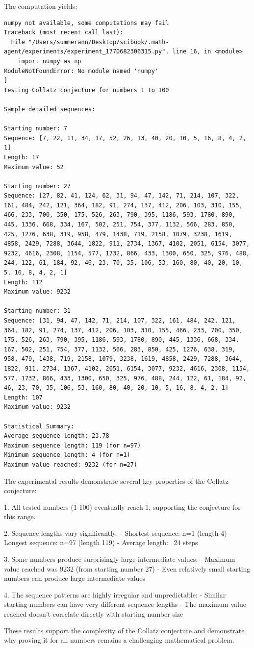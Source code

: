 The computation yields:
\begin{verbatim}
numpy not available, some computations may fail
Traceback (most recent call last):
  File "/Users/summerann/Desktop/scibook/.math-agent/experiments/experiment_1770682306315.py", line 16, in <module>
    import numpy as np
ModuleNotFoundError: No module named 'numpy'
]
Testing Collatz conjecture for numbers 1 to 100

Sample detailed sequences:

Starting number: 7
Sequence: [7, 22, 11, 34, 17, 52, 26, 13, 40, 20, 10, 5, 16, 8, 4, 2, 1]
Length: 17
Maximum value: 52

Starting number: 27
Sequence: [27, 82, 41, 124, 62, 31, 94, 47, 142, 71, 214, 107, 322, 161, 484, 242, 121, 364, 182, 91, 274, 137, 412, 206, 103, 310, 155, 466, 233, 700, 350, 175, 526, 263, 790, 395, 1186, 593, 1780, 890, 445, 1336, 668, 334, 167, 502, 251, 754, 377, 1132, 566, 283, 850, 425, 1276, 638, 319, 958, 479, 1438, 719, 2158, 1079, 3238, 1619, 4858, 2429, 7288, 3644, 1822, 911, 2734, 1367, 4102, 2051, 6154, 3077, 9232, 4616, 2308, 1154, 577, 1732, 866, 433, 1300, 650, 325, 976, 488, 244, 122, 61, 184, 92, 46, 23, 70, 35, 106, 53, 160, 80, 40, 20, 10, 5, 16, 8, 4, 2, 1]
Length: 112
Maximum value: 9232

Starting number: 31
Sequence: [31, 94, 47, 142, 71, 214, 107, 322, 161, 484, 242, 121, 364, 182, 91, 274, 137, 412, 206, 103, 310, 155, 466, 233, 700, 350, 175, 526, 263, 790, 395, 1186, 593, 1780, 890, 445, 1336, 668, 334, 167, 502, 251, 754, 377, 1132, 566, 283, 850, 425, 1276, 638, 319, 958, 479, 1438, 719, 2158, 1079, 3238, 1619, 4858, 2429, 7288, 3644, 1822, 911, 2734, 1367, 4102, 2051, 6154, 3077, 9232, 4616, 2308, 1154, 577, 1732, 866, 433, 1300, 650, 325, 976, 488, 244, 122, 61, 184, 92, 46, 23, 70, 35, 106, 53, 160, 80, 40, 20, 10, 5, 16, 8, 4, 2, 1]
Length: 107
Maximum value: 9232

Statistical Summary:
Average sequence length: 23.78
Maximum sequence length: 119 (for n=97)
Minimum sequence length: 4 (for n=1)
Maximum value reached: 9232 (for n=27)
\end{verbatim}

The experimental results demonstrate several key properties of the Collatz conjecture:

1. All tested numbers (1-100) eventually reach 1, supporting the conjecture for this range.

2. Sequence lengths vary significantly:
   - Shortest sequence: n=1 (length 4)
   - Longest sequence: n=97 (length 119)
   - Average length: ~24 steps

3. Some numbers produce surprisingly large intermediate values:
   - Maximum value reached was 9232 (from starting number 27)
   - Even relatively small starting numbers can produce large intermediate values

4. The sequence patterns are highly irregular and unpredictable:
   - Similar starting numbers can have very different sequence lengths
   - The maximum value reached doesn't correlate directly with starting number size

These results support the complexity of the Collatz conjecture and demonstrate why proving it for all numbers remains a challenging mathematical problem.